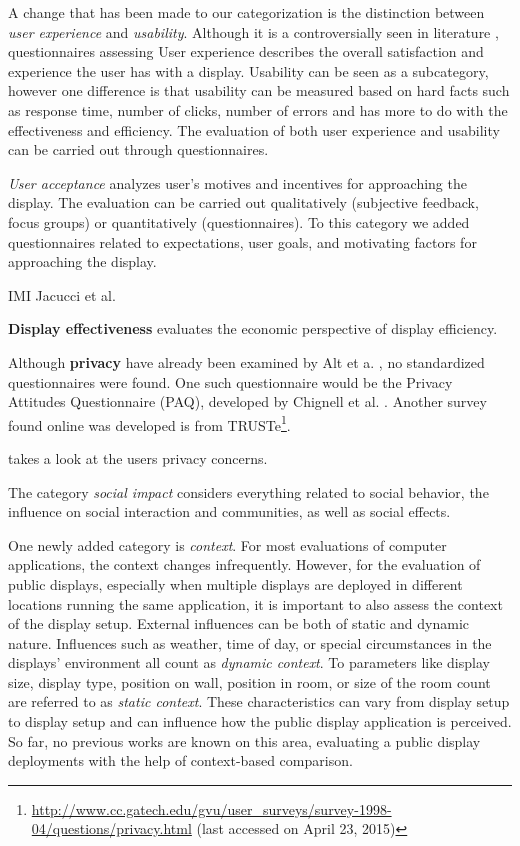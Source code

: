 	

\clearpage


	A change that has been made to our categorization is the distinction between \textit{user experience} and \textit{usability}. Although it is a controversially seen in literature \cite{bevan2009difference}, questionnaires assessing 
	User experience describes the overall satisfaction and experience the user has with a display. Usability can be seen as a subcategory, however one difference is that usability can be measured based on hard facts such as response time, number of clicks, number of errors and has more to do with the effectiveness and efficiency. The evaluation of both user experience and usability can be carried out through questionnaires. %

	\textit{User acceptance} analyzes user's motives and incentives for approaching the display. The evaluation can be carried out qualitatively (subjective feedback, focus groups) or quantitatively (questionnaires). To this category we added questionnaires related to expectations, user goals, and motivating factors for approaching the display. 

	IMI 		Jacucci et al. \cite{jacucci2010worldsofinformation}


	\textbf{Display effectiveness} evaluates the economic perspective of display efficiency. 

	Although \textbf{privacy} have already been examined by Alt et a. \cite{}, no standardized questionnaires were found. One such questionnaire would be the Privacy Attitudes Questionnaire (PAQ), developed by Chignell et al. \cite{chignell2003privacy}. Another survey found online was developed is from TRUSTe\footnote{\url{http://www.cc.gatech.edu/gvu/user_surveys/survey-1998-04/questions/privacy.html} (last accessed on April 23, 2015)}.

	 takes a look at the users privacy concerns.

	The category \textit{social impact} considers everything related to social behavior, the influence on social interaction and communities, as well as social effects.



	One newly added category is \textit{context}. For most evaluations of computer applications, the context changes infrequently. However, for the evaluation of public displays, especially when multiple displays are deployed in different locations running the same application, it is important to also assess the context of the display setup. External influences can be both of static and dynamic nature. Influences such as weather, time of day, or special circumstances in the displays' environment all count as \textit{dynamic context}. To parameters like display size, display type, position on wall, position in room, or size of the room count are referred to as \textit{static context}. These characteristics can vary from display setup to display setup and can influence how the public display application is perceived.
	So far, no previous works are known on this area, evaluating a public display deployments with the help of context-based comparison. 

